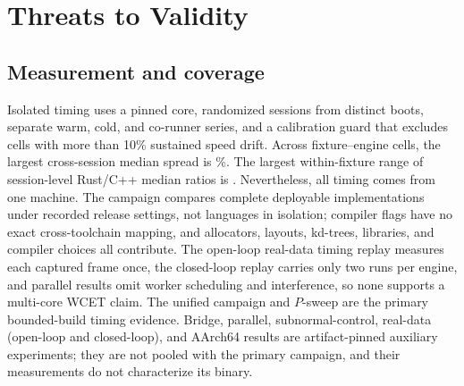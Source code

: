 \section{Threats to Validity}
\label{sec:threats}

\subsection{Measurement and coverage}
Isolated timing uses a pinned core, \envSessions{} randomized sessions from distinct boots,
separate warm, cold, and co-runner series, and a calibration guard that excludes cells with
more than 10\% sustained speed drift. Across fixture--engine cells, the largest
cross-session median spread is \sessMedSpreadWorstPct\%. The largest within-fixture range
of session-level Rust/C++ median ratios is \sessRatioSpreadWorst{}. Nevertheless, all timing
comes from one machine. The campaign compares complete deployable implementations under recorded
release settings, not languages in isolation; compiler flags have no exact cross-toolchain
mapping, and allocators, layouts, kd-trees, libraries, and compiler choices all contribute.
The open-loop real-data timing replay measures each captured frame once, the closed-loop
replay carries only two runs per engine, and parallel results omit worker scheduling and
interference, so none supports a multi-core WCET claim. The unified campaign and
$P$-sweep are the primary bounded-build timing evidence. Bridge, parallel, subnormal-control,
real-data (open-loop and closed-loop), and AArch64 results are artifact-pinned auxiliary
experiments; they are not pooled
with the primary campaign, and their measurements do not characterize its binary.

